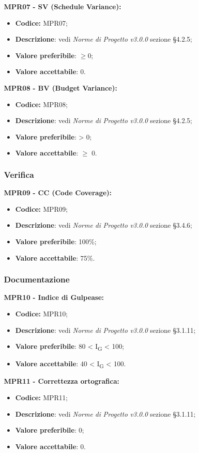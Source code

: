 \textbf{MPR07 - SV (Schedule Variance):}
\begin{itemize}
    \item \textbf{Codice:} MPR07;
    \item \textbf{Descrizione}: vedi \textit{Norme di Progetto v3.0.0} sezione \S 4.2.5;
    \item \textbf{Valore preferibile}: $\geq 0$;
    \item \textbf{Valore accettabile}: 0.
\end{itemize}
\textbf{MPR08 - BV (Budget Variance):}
\begin{itemize}
    \item \textbf{Codice:} MPR08;
    \item \textbf{Descrizione}: vedi \textit{Norme di Progetto v3.0.0} sezione \S 4.2.5;
    \item \textbf{Valore preferibile}: > 0;
    \item \textbf{Valore accettabile}: $\geq$ 0.
\end{itemize}
\subsubsection{Verifica}
\textbf{MPR09 - CC (Code Coverage):}
\begin{itemize}
    \item \textbf{Codice:} MPR09;
    \item \textbf{Descrizione}: vedi \textit{Norme di Progetto v3.0.0} sezione \S 3.4.6;
    \item \textbf{Valore preferibile}: 100\%;
    \item \textbf{Valore accettabile}: 75\%.
\end{itemize}
\subsubsection{Documentazione}
\textbf{MPR10 - Indice di Gulpease:}
\begin{itemize}
    \item \textbf{Codice:} MPR10;
    \item \textbf{Descrizione}: vedi \textit{Norme di Progetto v3.0.0} sezione \S 3.1.11;
    \item \textbf{Valore preferibile}: 80 < I\textsubscript{G} < 100;
    \item \textbf{Valore accettabile}: 40 < I\textsubscript{G} < 100.
\end{itemize}
\textbf{MPR11 - Correttezza ortografica:}
\begin{itemize}
    \item \textbf{Codice:} MPR11;
    \item \textbf{Descrizione}: vedi \textit{Norme di Progetto v3.0.0} sezione \S 3.1.11;
    \item \textbf{Valore preferibile}: 0;
    \item \textbf{Valore accettabile}: 0.
\end{itemize}
